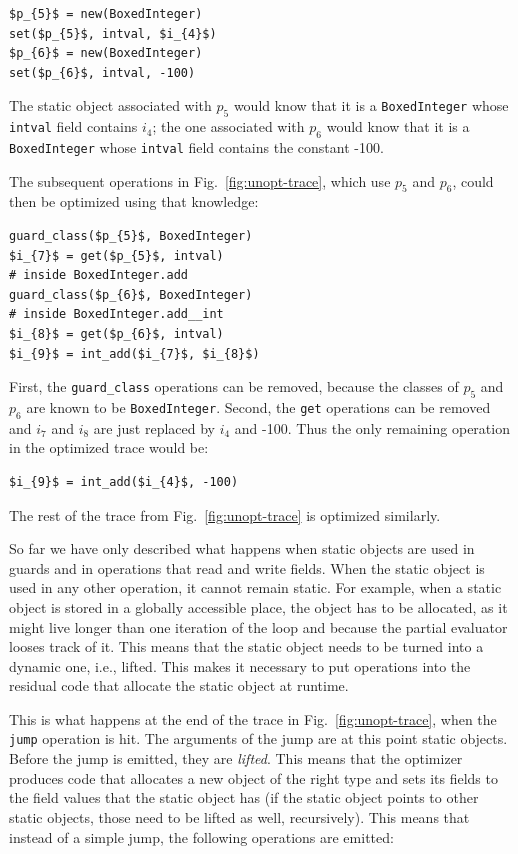 \documentclass[preprint]{sigplanconf}
\newcommand\ie{i.e.,\xspace}
\begin{document}
\begin{lstlisting}[mathescape,xleftmargin=20pt]
$p_{5}$ = new(BoxedInteger)
set($p_{5}$, intval, $i_{4}$)
$p_{6}$ = new(BoxedInteger)
set($p_{6}$, intval, -100)
\end{lstlisting}


The static object associated with $p_{5}$ would know that it is a
\lstinline{BoxedInteger} whose \lstinline{intval} field contains $i_{4}$; the
one associated with $p_{6}$ would know that it is a \lstinline{BoxedInteger}
whose \lstinline{intval} field contains the constant -100.

The subsequent operations in Fig.~\ref{fig:unopt-trace},
 which use $p_{5}$ and $p_{6}$, could then be
optimized using that knowledge:

\begin{lstlisting}[mathescape,xleftmargin=20pt]
guard_class($p_{5}$, BoxedInteger)
$i_{7}$ = get($p_{5}$, intval)
# inside BoxedInteger.add
guard_class($p_{6}$, BoxedInteger)
# inside BoxedInteger.add__int
$i_{8}$ = get($p_{6}$, intval)
$i_{9}$ = int_add($i_{7}$, $i_{8}$)
\end{lstlisting}

First, the \lstinline{guard_class} operations can be removed, because the classes of $p_{5}$ and
$p_{6}$ are known to be \lstinline{BoxedInteger}. Second, the \lstinline{get} operations can be removed
and $i_{7}$ and $i_{8}$ are just replaced by $i_{4}$ and -100. Thus the only
remaining operation in the optimized trace would be:

\begin{lstlisting}[mathescape,xleftmargin=20pt]
$i_{9}$ = int_add($i_{4}$, -100)
\end{lstlisting}

The rest of the trace from Fig.~\ref{fig:unopt-trace} is optimized similarly.

So far we have only described what happens when static objects are used in guards and in
operations that read and write fields. When the static
object is used in any other operation, it cannot remain static. For example, when
a static object is stored in a globally accessible place, the object has to
be allocated, as it might live longer than one iteration of the loop
and because the partial evaluator looses track of it. This means that the static
object needs to be turned into a dynamic one, \ie lifted. This makes it
necessary to put operations into the residual code that allocate the
static object at runtime.

This is what happens at the end of the trace in Fig.~\ref{fig:unopt-trace}, when the \lstinline{jump} operation
is hit. The arguments of the jump are at this point static objects. Before the
jump is emitted, they are \emph{lifted}. This means that the optimizer produces code
that allocates a new object of the right type and sets its fields to the field
values that the static object has (if the static object points to other static
objects, those need to be lifted as well, recursively). This means that instead of a simple jump,
the following operations are emitted:
\end{document}
